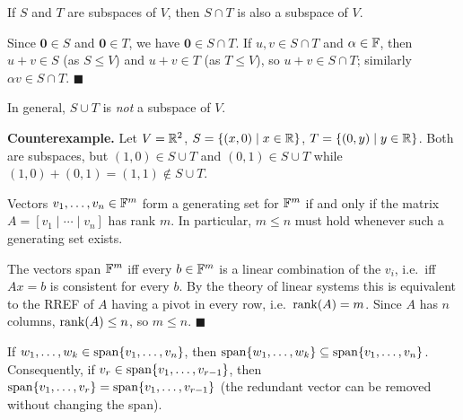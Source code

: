 \begin{propbox}
\label{prop:intersection-subspace}
If $S$ and $T$ are subspaces of $V$, then $S\cap T$ is also a subspace of $V$.
\end{propbox}

\begin{proofbox}
Since $\mathbf{0}\in S$ and $\mathbf{0}\in T$, we have $\mathbf{0}\in S\cap T$.
If $u,v\in S\cap T$ and $\alpha\in\mathbb{F}$, then $u+v\in S$ (as $S\le V$) and
$u+v\in T$ (as $T\le V$), so $u+v\in S\cap T$; similarly $\alpha v\in S\cap T$.
\hfill$\blacksquare$
\end{proofbox}

\begin{warnbox}
In general, $S\cup T$ is \emph{not} a subspace of $V$.

\textbf{Counterexample.}  Let $V=\mathbb{R}^2$,\; $S=\{(x,0)\mid x\in\mathbb{R}\}$,\;
$T=\{(0,y)\mid y\in\mathbb{R}\}$.  Both are subspaces, but
$(1,0)\in S\cup T$ and $(0,1)\in S\cup T$ while
$(1,0)+(0,1)=(1,1)\notin S\cup T$.
\end{warnbox}

\begin{propbox}
\label{prop:rank-generating}
Vectors $v_1,\ldots,v_n\in\mathbb{F}^m$ form a generating set for $\mathbb{F}^m$ if and only
if the matrix $A=[v_1\mid\cdots\mid v_n]$ has rank $m$.  In particular,
$m\le n$ must hold whenever such a generating set exists.
\end{propbox}

\begin{proofbox}
The vectors span $\mathbb{F}^m$ iff every $b\in\mathbb{F}^m$ is a linear combination of the
$v_i$, i.e.\ iff $Ax=b$ is consistent for every $b$.  By the theory of linear
systems this is equivalent to the RREF of $A$ having a pivot in every row,
i.e.\ $\operatorname{rank}(A)=m$.  Since $A$ has $n$ columns, $\operatorname{rank}(A)\le n$, so $m\le n$.
\hfill$\blacksquare$
\end{proofbox}

\begin{tipbox}
If $w_1,\ldots,w_k\in\operatorname{span}\{v_1,\ldots,v_n\}$, then
$\operatorname{span}\{w_1,\ldots,w_k\}\subseteq\operatorname{span}\{v_1,\ldots,v_n\}$.
Consequently, if $v_r\in\operatorname{span}\{v_1,\ldots,v_{r-1}\}$, then
$\operatorname{span}\{v_1,\ldots,v_r\}=\operatorname{span}\{v_1,\ldots,v_{r-1}\}$ (the redundant vector
can be removed without changing the span).
\end{tipbox}
